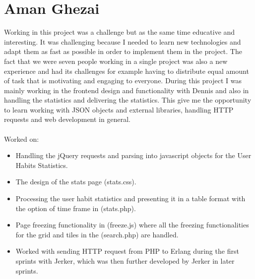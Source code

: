 \section{Aman Ghezai}
Working in this project was a challenge but as the same time educative and
interesting. It was challenging because I needed to learn new technologies and
adapt them as fast as possible in order to implement them in the project. The
fact that we were seven people working in a single project was also a new
experience and had its challenges for example having to distribute equal amount
of task that is motivating and engaging to everyone. During this project I was
mainly working in the frontend design and functionality with Dennis and also in
handling the statistics and delivering the statistics. This give me the
opportunity to learn working with JSON objects and external libraries, handling
HTTP requests and web development in general. \\ \\
Worked on:
\begin{itemize}
  \item Handling the jQuery requests and parsing into javascript objects for the
        User Habits Statistics.
  \item The design of the stats page (stats.css).
  \item Processing the user habit statistics and presenting it in a table format
        with the option of time frame in (stats.php).
  \item Page freezing functionality in (freeze.js) where all the freezing
        functionalities for the grid and tiles in the (search.php) are handled.
  \item Worked with sending HTTP request from PHP to Erlang during the first
        sprints with Jerker, which was then further developed by Jerker in later
        sprints.
\end{itemize}
\newpage

